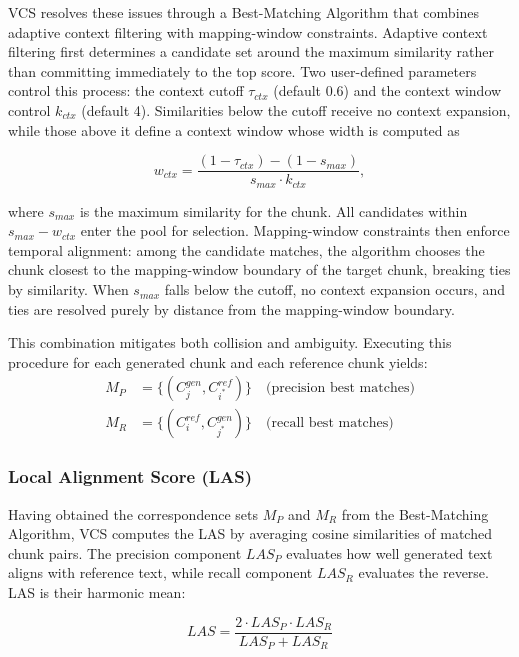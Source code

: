 \documentclass[main.tex]{subfiles}
\begin{document}
VCS resolves these issues through a Best-Matching Algorithm that combines adaptive context filtering with mapping-window constraints. Adaptive context filtering first determines a candidate set around the maximum similarity rather than committing immediately to the top score. Two user-defined parameters control this process: the context cutoff $\tau_{ctx}$ (default 0.6) and the context window control $k_{ctx}$ (default 4). Similarities below the cutoff receive no context expansion, while those above it define a context window whose width is computed as

\begin{equation}
w_{ctx} = \frac{(1-\tau_{ctx})-(1-s_{max})}{s_{max} \cdot k_{ctx}},
\end{equation}

where $s_{max}$ is the maximum similarity for the chunk. All candidates within $s_{max} - w_{ctx}$ enter the pool for selection. Mapping-window constraints then enforce temporal alignment: among the candidate matches, the algorithm chooses the chunk closest to the mapping-window boundary of the target chunk, breaking ties by similarity. When $s_{max}$ falls below the cutoff, no context expansion occurs, and ties are resolved purely by distance from the mapping-window boundary.

This combination mitigates both collision and ambiguity. Executing this procedure for each generated chunk and each reference chunk yields:
\begin{align}
M_P &= \{(C_j^{gen}, C_{i^*}^{ref})\} \quad \text{(precision best matches)} \\
M_R &= \{(C_i^{ref}, C_{j^*}^{gen})\} \quad \text{(recall best matches)}
\end{align}

\subsubsection{Local Alignment Score (LAS)}
Having obtained the correspondence sets $M_P$ and $M_R$ from the Best-Matching Algorithm, VCS computes the LAS by averaging cosine similarities of matched chunk pairs. The precision component $LAS_P$ evaluates how well generated text aligns with reference text, while recall component $LAS_R$ evaluates the reverse. LAS is their harmonic mean:

\begin{equation}
LAS = \frac{2 \cdot LAS_P \cdot LAS_R}{LAS_P + LAS_R}
\end{equation}
\end{document}
